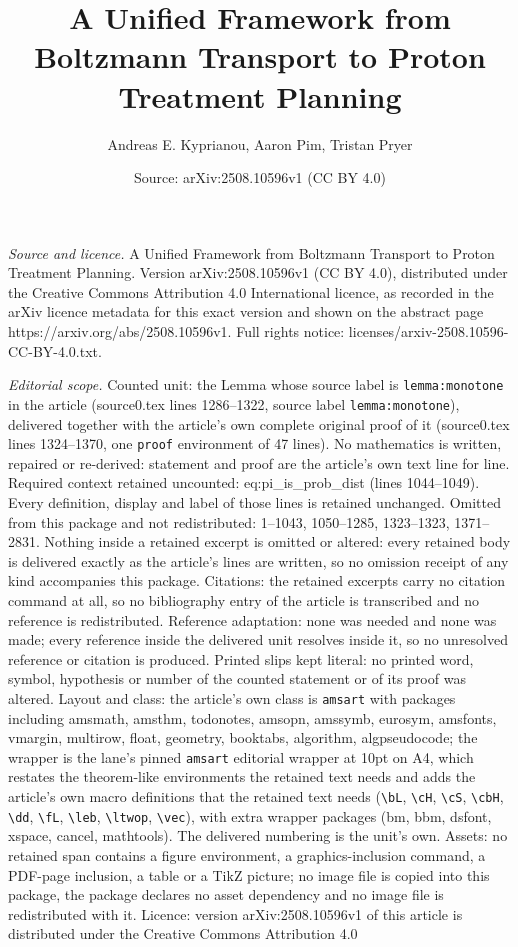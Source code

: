 \documentclass[10pt,a4paper]{amsart}
\title[A Unified Framework from Boltzmann Transport to Proton Treat]{A Unified Framework from Boltzmann Transport to Proton Treatment Planning}
\author{Andreas E. Kyprianou, Aaron Pim, Tristan Pryer}
\date{Source: arXiv:2508.10596v1 (CC BY 4.0)}
\begin{document}
\maketitle

\noindent\emph{Source and licence.} A Unified Framework from Boltzmann Transport to Proton Treatment Planning. Version arXiv:2508.10596v1 (CC BY 4.0), distributed under the Creative Commons Attribution 4.0 International licence, as recorded in the arXiv licence metadata for this exact version and shown on the abstract page https://arxiv.org/abs/2508.10596v1. Full rights notice: licenses/arxiv-2508.10596-CC-BY-4.0.txt.\par\smallskip

\noindent\textit{Editorial scope.} Counted unit: the Lemma whose source label is \texttt{lemma:monotone} in the article (source0.tex lines 1286--1322, source label \texttt{lemma:monotone}), delivered together with the article's own complete original proof of it (source0.tex lines 1324--1370, one \texttt{proof} environment of 47 lines). No mathematics is written, repaired or re-derived: statement and proof are the article's own text line for line. Required context retained uncounted: eq:pi\_is\_prob\_dist (lines 1044--1049). Every definition, display and label of those lines is retained unchanged. Omitted from this package and not redistributed: 1--1043, 1050--1285, 1323--1323, 1371--2831. Nothing inside a retained excerpt is omitted or altered: every retained body is delivered exactly as the article's lines are written, so no omission receipt of any kind accompanies this package. Citations: the retained excerpts carry no citation command at all, so no bibliography entry of the article is transcribed and no reference is redistributed. Reference adaptation: none was needed and none was made; every reference inside the delivered unit resolves inside it, so no unresolved reference or citation is produced. Printed slips kept literal: no printed word, symbol, hypothesis or number of the counted statement or of its proof was altered. Layout and class: the article's own class is \texttt{amsart} with packages including amsmath, amsthm, todonotes, amsopn, amssymb, eurosym, amsfonts, vmargin, multirow, float, geometry, booktabs, algorithm, algpseudocode; the wrapper is the lane's pinned \texttt{amsart} editorial wrapper at 10pt on A4, which restates the theorem-like environments the retained text needs and adds the article's own macro definitions that the retained text needs (\texttt{\textbackslash bL}, \texttt{\textbackslash cH}, \texttt{\textbackslash cS}, \texttt{\textbackslash cbH}, \texttt{\textbackslash dd}, \texttt{\textbackslash fL}, \texttt{\textbackslash leb}, \texttt{\textbackslash ltwop}, \texttt{\textbackslash vec}), with extra wrapper packages (bm, bbm, dsfont, xspace, cancel, mathtools). The delivered numbering is the unit's own. Assets: no retained span contains a figure environment, a graphics-inclusion command, a PDF-page inclusion, a table or a TikZ picture; no image file is copied into this package, the package declares no asset dependency and no image file is redistributed with it. Licence: version arXiv:2508.10596v1 of this article is distributed under the Creative Commons Attribution 4.0 
\end{document}
